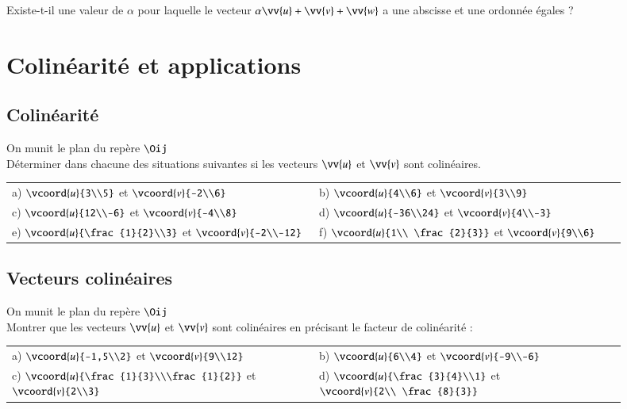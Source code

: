 \documentclass[oneside,12pt]{article}          %
\begin{document}
Existe-t-il une valeur de $\alpha$ pour laquelle le vecteur $\alpha\vv{u}+\vv{v}+\vv{w}$ a une abscisse et une ordonnée égales ?



\section{Colinéarité et applications}

\subsection{Colinéarité}
On munit le plan du repère $\Oij$ \\
Déterminer dans chacune des situations suivantes si les vecteurs $\vv{u}$ et $\vv{v}$ sont colinéaires.

\renewcommand{\arraystretch}{2.5}
\begin{tabular}{p{0.45\linewidth} p{0.45\linewidth}}
	a) $\vcoord{u}{3\\5}$ et $\vcoord{v}{-2\\6}$ & b) $\vcoord{u}{4\\6}$ et $\vcoord{v}{3\\9}$ \\
	c) $\vcoord{u}{12\\-6}$ et $\vcoord{v}{-4\\8}$ & d) $\vcoord{u}{-36\\24}$ et $\vcoord{v}{4\\-3}$ \\
	e) $\vcoord{u}{\frac{1}{2}\\3}$ et $\vcoord{v}{-2\\-12}$ & f) $\vcoord{u}{1\\ \frac{2}{3}}$ et $\vcoord{v}{9\\6}$ \\
\end{tabular}



\subsection{Vecteurs colinéaires}
On munit le plan du repère $\Oij$ \\
Montrer que les vecteurs $\vv{u}$ et $\vv{v}$ sont colinéaires en précisant le facteur de colinéarité :

\renewcommand{\arraystretch}{2.5}
\begin{tabular}{p{0.45\linewidth} p{0.45\linewidth}}
	a) $\vcoord{u}{-1,5\\2}$ et $\vcoord{v}{9\\12}$ & b) $\vcoord{u}{6\\4}$ et $\vcoord{v}{-9\\-6}$ \\
	c) $\vcoord{u}{\frac{1}{3}\\\frac{1}{2}}$ et $\vcoord{v}{2\\3}$ & d) $\vcoord{u}{\frac{3}{4}\\1}$ et $\vcoord{v}{2\\ \frac{8}{3}}$ \\
\end{tabular}
\end{document}
